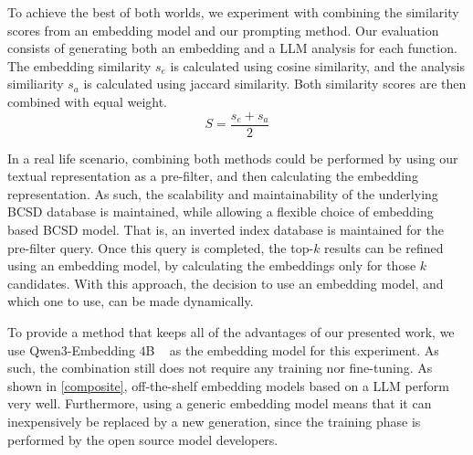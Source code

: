 To achieve the best of both worlds, we experiment with combining the similarity scores from an embedding model and our prompting method.
Our evaluation consists of generating both an embedding and a LLM analysis for each function. The embedding similarity \(s_e\) is calculated
using cosine similarity, and the analysis similiarity \(s_a\) is calculated using jaccard similarity. Both similarity scores are then combined
with equal weight.
\[
    S = \frac{s_e + s_a}{2}
\]

In a real life scenario, combining both methods could be performed by using our textual representation as a pre-filter, and then calculating
the embedding representation. As such, the scalability and maintainability of the underlying BCSD database is maintained, while allowing a flexible
choice of embedding based BCSD model. That is, an inverted index database is maintained for the pre-filter query. Once this query is completed, the
top-\(k\) results can be refined using an embedding model, by calculating the embeddings only for those \(k\) candidates. With this approach,
the decision to use an embedding model, and which one to use, can be made dynamically.

To provide a method that keeps all of the advantages of our presented work, we use Qwen3-Embedding \(4\)B ~\cite{qwen3} as the embedding model for this experiment.
As such, the combination still does not require any training nor fine-tuning. As shown in \autoref{composite}, off-the-shelf embedding models
based on a LLM perform very well. Furthermore, using a generic embedding model means that it can inexpensively be replaced by a new generation, since
the training phase is performed by the open source model developers.

